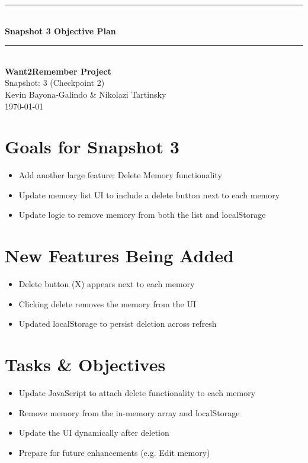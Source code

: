 \documentclass[12pt]{article}
\begin{document}
\begin{titlepage}
    \newcommand{\HRule}{\rule{\linewidth}{0.5mm}} 
    \vspace*{\fill}
    \begin{center}
        \HRule \\[0.5cm]
        {\Huge \bfseries Snapshot 3 Objective Plan \\[0.4cm]}
        \HRule \\[1.5cm]
        {\LARGE \textbf{Want2Remember Project}}\\[0.5cm]
        {\Large Snapshot: 3 (Checkpoint 2)}\\[2cm]
        {\Large Kevin Bayona-Galindo \& Nikolazi Tartinsky}\\[0.5cm]
        {\large \today}
    \end{center}
    \vspace*{\fill}
\end{titlepage}

\section*{Goals for Snapshot 3}
\begin{itemize}
  \item Add another large feature: Delete Memory functionality
  \item Update memory list UI to include a delete button next to each memory
  \item Update logic to remove memory from both the list and localStorage
\end{itemize}

\section*{New Features Being Added}
\begin{itemize}
  \item Delete button (X) appears next to each memory
  \item Clicking delete removes the memory from the UI
  \item Updated localStorage to persist deletion across refresh
\end{itemize}

\section*{Tasks \& Objectives}
\begin{itemize}
  \item Update JavaScript to attach delete functionality to each memory
  \item Remove memory from the in-memory array and localStorage
  \item Update the UI dynamically after deletion
  \item Prepare for future enhancements (e.g. Edit memory)
\end{itemize}
\end{document}
